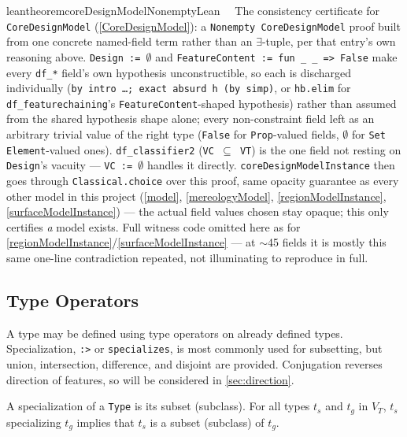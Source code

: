 \begin{restatable}{leantheorem}{coreDesignModelNonemptyLean}~~
The consistency certificate for \texttt{CoreDesignModel} (\ref{CoreDesignModel}): a
\texttt{Nonempty CoreDesignModel} proof built from one concrete named-field term rather than an
$\exists$-tuple, per that entry's own reasoning above. \texttt{Design := $\emptyset$} and
\texttt{FeatureContent := fun \_ \_ => False} make every \texttt{df\_*} field's own hypothesis
unconstructible, so each is discharged individually (\texttt{by intro \ldots; exact absurd h (by simp)},
or \texttt{hb.elim} for \texttt{df\_featurechaining}'s \texttt{FeatureContent}-shaped hypothesis) rather
than assumed from the shared hypothesis shape alone; every non-constraint field left as an arbitrary
trivial value of the right type (\texttt{False} for \texttt{Prop}-valued fields, $\emptyset$ for
\texttt{Set Element}-valued ones). \texttt{df\_classifier2} (\texttt{VC $\subseteq$ VT}) is the one field
not resting on \texttt{Design}'s vacuity --- \texttt{VC := $\emptyset$} handles it directly.
\texttt{coreDesignModelInstance} then goes through \texttt{Classical.choice} over this proof, same
opacity guarantee as every other model in this project (\ref{model}, \ref{mereologyModel},
\ref{regionModelInstance}, \ref{surfaceModelInstance}) --- the actual field values chosen stay opaque;
this only certifies \emph{a} model exists. Full witness code omitted here as for
\ref{regionModelInstance}/\ref{surfaceModelInstance} --- at $\sim$45 fields it is mostly this same
one-line contradiction repeated, not illuminating to reproduce in full.
\label{coreDesignModel_nonempty}
\label{coreDesignModelInstance}
\end{restatable}

\subsection{Type Operators}

\pn A type may be defined using type operators on already defined types.  Specialization, \texttt{:>} or \texttt{specializes}, is most commonly used for subsetting, but union, intersection, difference, and disjoint are provided.  Conjugation reverses direction of features, so will be considered in \ref{sec:direction}.

\pn A specialization of a \texttt{Type} is its subset (subclass).  For all types $t_s$ and $t_g$ in $V_T$, $t_s$ specializing $t_g$ implies that $t_s$ is a subset (subclass) of $t_g$.

